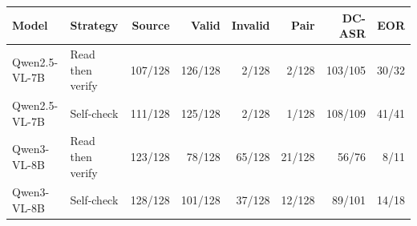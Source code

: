 \begin{tabular}{llrrrrrr}
\toprule
Model & Strategy & Source & Valid & Invalid & Pair & DC-ASR & EOR \\
\midrule
Qwen2.5-VL-7B & Read then verify & 107/128 & 126/128 & 2/128 & 2/128 & 103/105 & 30/32 \\
Qwen2.5-VL-7B & Self-check & 111/128 & 125/128 & 2/128 & 1/128 & 108/109 & 41/41 \\
Qwen3-VL-8B & Read then verify & 123/128 & 78/128 & 65/128 & 21/128 & 56/76 & 8/11 \\
Qwen3-VL-8B & Self-check & 128/128 & 101/128 & 37/128 & 12/128 & 89/101 & 14/18 \\
\bottomrule
\end{tabular}

